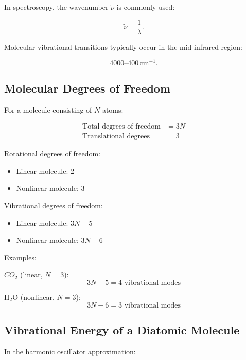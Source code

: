 In spectroscopy, the wavenumber $\tilde{\nu}$ is commonly used:

\begin{equation}
\tilde{\nu} = \frac{1}{\lambda}.
\end{equation}

Molecular vibrational transitions typically occur in the mid-infrared region:

\begin{equation}
4000 \text{--} 400 \,\text{cm}^{-1}.
\end{equation}

\subsection{Molecular Degrees of Freedom}

For a molecule consisting of $N$ atoms:

\begin{align}
\text{Total degrees of freedom} &= 3N \\
\text{Translational degrees} &= 3
\end{align}

Rotational degrees of freedom:
\begin{itemize}
    \item Linear molecule: 2
    \item Nonlinear molecule: 3
\end{itemize}

Vibrational degrees of freedom:
\begin{itemize}
    \item Linear molecule: $3N - 5$
    \item Nonlinear molecule: $3N - 6$
\end{itemize}

Examples:

$CO_2$ (linear, $N=3$):
\begin{equation}
3N - 5 = 4 \text{ vibrational modes}
\end{equation}

H$_2$O (nonlinear, $N=3$):
\begin{equation}
3N - 6 = 3 \text{ vibrational modes}
\end{equation}

\subsection{Vibrational Energy of a Diatomic Molecule}

In the harmonic oscillator approximation:

